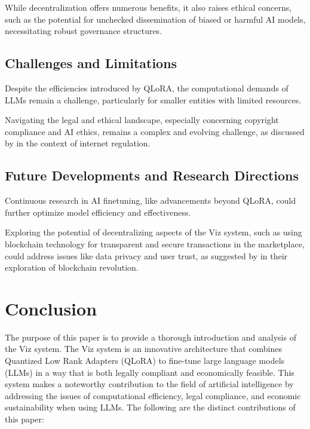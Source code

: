 \documentclass{article}
\begin{document}
While decentralization offers numerous benefits, it also raises ethical concerns, such as the potential for unchecked dissemination of biased or harmful AI models, necessitating robust governance structures.

\subsection{Challenges and Limitations}

Despite the efficiencies introduced by QLoRA, the computational demands of LLMs remain a challenge, particularly for smaller entities with limited resources.

Navigating the legal and ethical landscape, especially concerning copyright compliance and AI ethics, remains a complex and evolving challenge, as discussed by \cite{lessig2006code} in the context of internet regulation.

\subsection{Future Developments and Research Directions}
Continuous research in AI finetuning, like advancements beyond QLoRA, could further optimize model efficiency and effectiveness.

Exploring the potential of decentralizing aspects of the Viz system, such as using blockchain technology for transparent and secure transactions in the marketplace, could address issues like data privacy and user trust, as suggested by \cite{tapscott2016blockchain} in their exploration of blockchain revolution.

\section{Conclusion}

The purpose of this paper is to provide a thorough introduction and analysis of the Viz system. The Viz system is an innovative architecture that combines Quantized Low Rank Adapters (QLoRA) to fine-tune large language models (LLMs) in a way that is both legally compliant and economically feasible. This system makes a noteworthy contribution to the field of artificial intelligence by addressing the issues of computational efficiency, legal compliance, and economic sustainability when using LLMs. The following are the distinct contributions of this paper:
\end{document}
